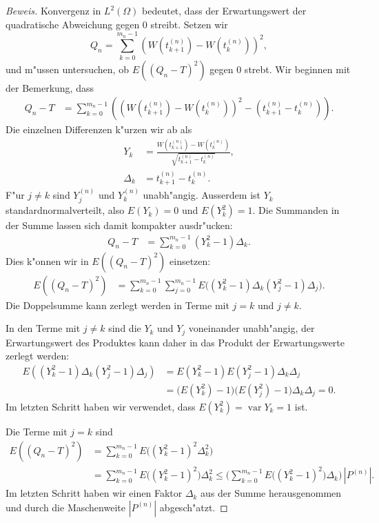 \begin{proof}[Beweis]
Konvergenz in $L^2(\Omega)$ bedeutet, dass der Erwartungswert der
quadratische Abweichung gegen $0$ streibt.
Setzen wir
\[
Q_n
= 
\sum_{k=0}^{m_n-1} \left(W(t_{k+1}^{(n)})-W(t_{k}^{(n)})\right)^2,
\]
und m"ussen untersuchen, ob $E((Q_n - T)^2)$ gegen $0$ strebt.
Wir beginnen mit der Bemerkung, dass
\begin{align*}
Q_n-T
&=
\sum_{k=0}^{m_n-1}
\left((W(t_{k+1}^{(n)})-W(t_{k}^{(n)}))^2 - (t_{k+1}^{(n)}-t_k^{(n)})\right).
\end{align*}
Die einzelnen Differenzen k"urzen wir ab als
\begin{align*}
Y_k
&=
\frac{W(t_{k+1}^{(n)})-W(t_k^{(n)})}{\sqrt{t_{k+1}^{(n)}-t_{k}^{(n)}}},
\\
\Delta_k
&=
t_{k+1}^{(n)}-t_k^{(n)}.
\end{align*}
F"ur $j\ne k$ sind $Y_j^{(n)}$ und $Y_{k}^{(n)}$ unabh"angig.
Ausserdem ist $Y_k$ standardnormalverteilt, also $E(Y_k)=0$
und $E(Y_k^2)=1$.
Die Summanden in der Summe lassen sich damit kompakter ausdr"ucken:
\begin{align*}
Q_n-T
&=
\sum_{k=0}^{m_n-1} (Y_k^2-1) \Delta_k.
\end{align*}
Dies k"onnen wir in $E((Q_n-T)^2)$ einsetzen:
\begin{align*}
E((Q_n-T)^2)
&=
\sum_{k=0}^{m_n-1}
\sum_{j=0}^{m_n-1}
E\biggl(
(Y_k^2-1)\Delta_k
(Y_j^2-1)\Delta_j
\biggr).
\end{align*}
Die Doppelsumme kann zerlegt werden in Terme mit $j=k$ und $j\ne k$.

In den Terme mit $j\ne k$ sind die $Y_k$ und $Y_j$ voneinander unabh"angig,
der Erwartungswert des Produktes kann daher in das Produkt der Erwartungswerte
zerlegt werden:
\begin{align*}
E\left(
(Y_k^2-1)\Delta_k
(Y_j^2-1)\Delta_j
\right)
&=
E(Y_k^2-1)
E(Y_j^2-1)
\Delta_k
\Delta_j
\\
&=
\bigl(E(Y_k^2) -1\bigr)
\bigl(E(Y_j^2) -1\bigr)
\Delta_k
\Delta_j
=0.
\end{align*}
Im letzten Schritt haben wir verwendet, dass $E(Y_k^2)=\operatorname{var}Y_k=1$
ist.

Die Terme mit $j=k$ sind 
\begin{align*}
E((Q_n-T)^2)
&=
\sum_{k=0}^{m_n-1} E\biggl((Y_k^2-1)^2\Delta_k^2\biggr)
\\
&=
\sum_{k=0}^{m_n-1} E\bigl((Y_k^2-1)^2\bigr)\Delta_k^2
\le 
\biggl(\sum_{k=0}^{m_n-1} E\bigl((Y_k^2-1)^2\bigr)\Delta_k\biggr)\, |P^{(n)}|.
\end{align*}
Im letzten Schritt haben wir einen Faktor $\Delta_k$ aus der Summe
herausgenommen und durch die Maschenweite $|P^{(n)}|$ abgesch"atzt.


\end{proof}
